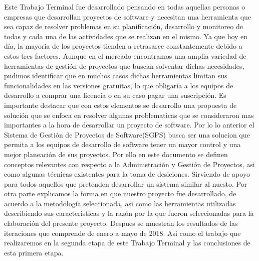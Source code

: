  
Este Trabajo Terminal fue desarrollado pensando en todas aquellas personas o empresas que desarrollan proyectos de software y necesitan una herramienta que sea capaz de resolver problemas en su planificación, desarrollo y monitoreo de todas y cada una de las actividades que se realizan en el mismo. Ya que hoy en día, la mayoria de los proyectos tienden a retrasarce constantemente debido a estos tres factores.
\newline \newline 
Aunque en el mercado encontramos una amplia variedad de herramientas de gestión de proyectos que buscan solventar dichas necesidades, pudimos identificar que en muchos casos dichas herramientas limitan sus funcionalidades en las versiones gratuitas, lo que obligaría a los equipos de desarrollo a comprar una licencia o en su caso pagar una suscripción. Es importante destacar que con estos elementos se desarrollo una propuesta de solución que se enfoca en resolver algunas problematicas que se consideraron mas importantes a la hora de desarrollar un proyecto de software.
\newline \newline 
Por lo lo anterior el Sistema de Gestión de Proyectos de Software(SGPS) busca ser una solucion que permita a los equipos de desarrollo de software tener un mayor control y una mejor planeación de sus proyectos.
Por ello en este documento se definen conceptos relevantes con respecto a la Administración y Gestión de Proyectos, asi como algunas técnicas existentes para la toma de desiciones. Sirviendo de apoyo para todos aquellos que pretenden desarrollar un sistema similar al nuesto. 
\newline \newline 
Por otra parte explicamos la forma en que nuestro proyecto fue desarrollado, de acuerdo a la metodología seleccionada, asi como las herramientas utilizadas describiendo sus caracteristicas y la razón por la que fueron seleccionadas para la elaboración del presente proyecto. Despues se muestran los resultados de las iteraciones que comprende de enero a mayo de 2018. Asi como el trabajo que realizaremos en la segunda etapa de este Trabajo Terminal y las conclusiones de esta primera etapa.